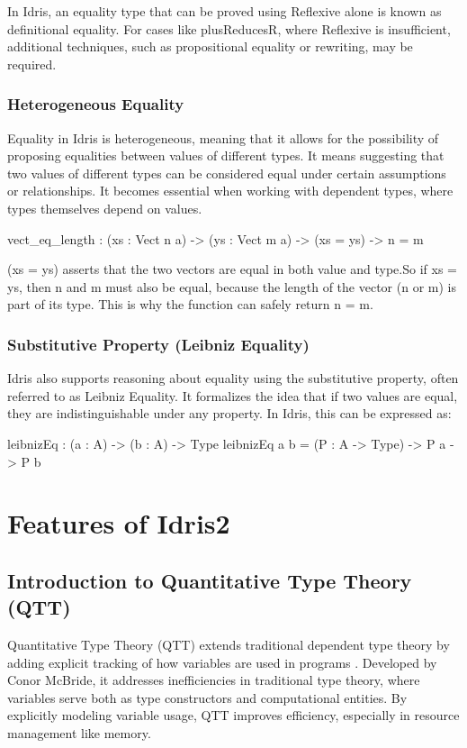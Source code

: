 \documentclass[]{rptuseminar}
\begin{document}
In Idris, an equality type that can be proved using Reflexive alone is known as definitional equality. For cases like plusReducesR, where Reflexive is insufficient, additional techniques, such as propositional equality or rewriting, may be required.
\subsubsection{Heterogeneous Equality}
Equality in Idris is heterogeneous, meaning that it allows for the possibility of proposing equalities between values of different types. It means suggesting that two values of different types can be considered equal under certain assumptions or relationships. It becomes essential when working with dependent types, where types themselves depend on values.
\begin{idris}
    vect_eq_length : (xs : Vect n a) -> (ys : Vect m a) ->
    (xs = ys) -> n = m 
\end{idris}
(xs = ys) asserts that the two vectors are equal in both value and type.So if xs = ys, then n and m must also be equal, because the length of the vector (n or m) is part of its type. This is why the function can safely return n = m.
\subsubsection{Substitutive Property (Leibniz Equality)}
Idris also supports reasoning about equality using the substitutive property, often referred to as Leibniz Equality.
It formalizes the idea that if two values are equal, they are indistinguishable under any property. In Idris, this can be expressed as:
\begin{idris}
leibnizEq : (a : A) -> (b : A) -> Type
leibnizEq a b = (P : A -> Type) -> P a -> P b
\end{idris}
\section{Features of Idris2}  
\label{sec:features}
\subsection{Introduction to Quantitative Type Theory (QTT)}
Quantitative Type Theory (QTT) extends traditional dependent type theory by adding explicit tracking of how variables are used in programs \cite{atkey2018syntax}. Developed by Conor McBride, it addresses inefficiencies in traditional type theory, where variables serve both as type constructors and computational entities. By explicitly modeling variable usage, QTT improves efficiency, especially in resource management like memory.
\end{document}
